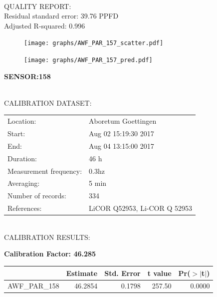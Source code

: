 \documentclass[oneside]{report}
\begin{document}
\hrulefill\\
QUALITY REPORT:\\
Residual standard error: 39.76 PPFD\\
Adjusted R-squared: 0.996



\begin{figure}[H]
  \centering
  \texttt{[image: graphs/AWF\_PAR\_157\_scatter.pdf]}
\end{figure}




\begin{figure}[H]
  \centering
  \texttt{[image: graphs/AWF\_PAR\_157\_pred.pdf]}
\end{figure}

\pagebreak


\begin{center}
\large{\textbf{SENSOR:158}}\\
\end{center}

\hrulefill\\
CALIBRATION DATASET:\\
\begin{table}[h!]
  \centering
  \label{tab:table1}
  \begin{tabular}{ll}
    Location: & Aboretum Goettingen\\ 
    
    
    Start:  & Aug 02 15:19:30 2017 \\
    End:   & Aug 04 13:15:00 2017\\ 
    Duration: & 46 h\\
    Measurement frequency: & 0.3hz\\
    Averaging:  &5 min\\
    Number of records: & 334 \\
    References: & LiCOR Q52953, Li-COR Q 52953 \\
  \end{tabular}
\end{table}

\hrulefill\\
CALIBRATION RESULTS:\\


\begin{center}
\textbf{\large{Calibration Factor: 46.285}}\\
\end{center}
\begin{table}[ht]
\centering
\begin{tabular}{rrrrr}
  \hline
 & Estimate & Std. Error & t value & Pr($>$$|$t$|$) \\ 
  \hline
AWF\_PAR\_158 & 46.2854 & 0.1798 & 257.50 & 0.0000 \\ 
   \hline
\end{tabular}
\end{table}
\end{document}
